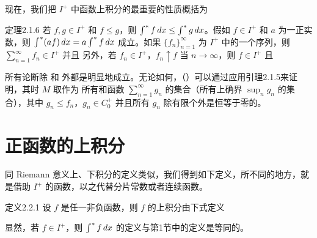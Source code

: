 现在，我们把 $I^+$ 中函数上积分的最重要的性质概括为
\begin{statement}{定理}{2.1.6}
若 $f,g\in I^+$ 和 $f\le g$，则 $\int^{*} f\,dx\le\int^{*} g\,dx$。假如 $f\in I^+$ 和 $a$ 为一正实数，则 $\int^{*}(af)\,dx=a\int^{*} f\,dx$ 成立。如果 $\{f_n\}_{n=1}^\infty$ 为 $I^+$ 中的一个序列，则 $\sum_{n=1}^\infty f_n\in I^+$ 并且
另外，若 $f_n\in I^+$，$f_n\uparrow f$ 当 $n\to\infty$，则 $f\in I^+$ 且
\end{statement}
\Proof 所有论断除  和  外都是明显地成立。无论如何，（）可以通过应用引理2.1.5来证明，其时 $M$ 取作为
所有和函数 $\sum_{n=1}^\infty g_n$ 的集合（所有上确界 $\sup_n g_n$ 的集合），其中 $g_n\le f_n$，$g_n\in C_0^+$ 并且所有 $g_n$ 除有限个外是恒等于零的。
\section{正函数的上积分}
同 Riemann 意义上、下积分的定义类似，我们得到如下定义，所不同的地方，就是借助 $I^+$ 的函数，以之代替分片常数或者连续函数。
\begin{statement}{定义}{2.2.1}
设 $f$ 是任一非负函数，则 $f$ 的上积分由下式定义
\end{statement}
显然，若 $f\in I^+$，则 $\int^{*} f\,dx$ 的定义与第1节中的定义是等同的。

